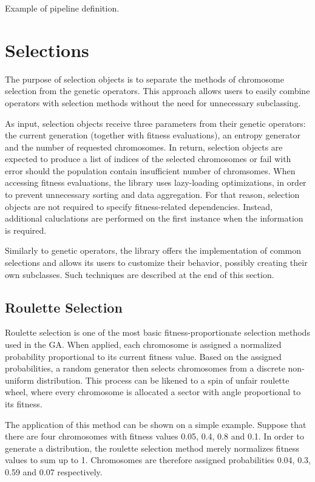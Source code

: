 \begin{listing}[ht]
	\caption{Example of pipeline definition.}
	\label{listing:pipeline-definition}
\end{listing}

\section{Selections}\label{section:selection}
The purpose of selection objects is to separate the methods of chromosome selection from the genetic operators. This approach allows users to easily combine operators with selection methods without the need for unnecessary subclassing.

As input, selection objects receive three parameters from their genetic operators: the current generation (together with fitness evaluations), an entropy generator and the number of requested chromosomes. In return, selection objects are expected to produce a list of indices of the selected chromosomes or fail with error should the population contain insufficient number of chromsomes. When accessing fitness evaluations, the library uses lazy-loading optimizations, in order to prevent unnecessary sorting and data aggregation. For that reason, selection objects are not required to specify fitness-related dependencies. Instead, additional caluclations are performed on the first instance when the information is required.

Similarly to genetic operators, the library offers the implementation of common selections and allows its users to customize their behavior, possibly creating their own subclasses. Such techniques are described at the end of this section.

\subsection{Roulette Selection}
Roulette selection is one of the most basic fitness-proportionate selection methods used in the GA. When applied, each chromosome is assigned a normalized probability proportional to its current fitness value. Based on the assigned probabilities, a random generator then selects chromosomes from a discrete non-uniform distribution. This process can be likened to a spin of unfair roulette wheel, where every chromosome is allocated a sector with angle proportional to its fitness. \cite{GaConceptsDesigns}

The application of this method can be shown on a simple example. Suppose that there are four chromosomes with fitness values 0.05, 0.4, 0.8 and 0.1. In order to generate a distribution, the roulette selection method merely normalizes fitness values to sum up to 1. Chromosomes are therefore assigned probabilities 0.04, 0.3, 0.59 and 0.07 respectively.

